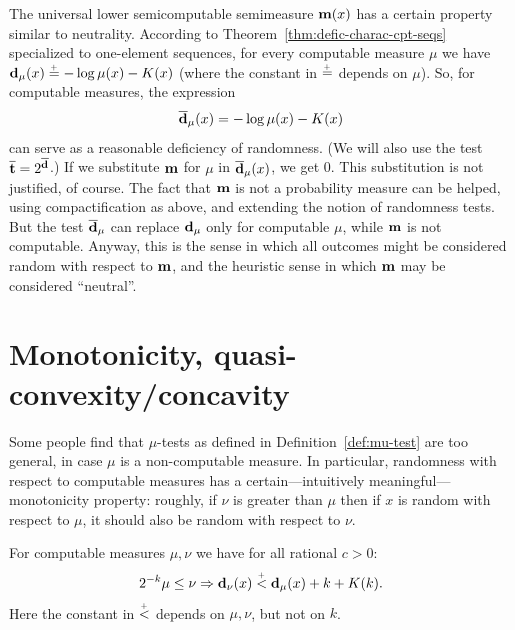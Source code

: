 The universal lower semicomputable
semimeasure \( \mathbf{m}(x) \) has a certain property similar to neutrality.
According to Theorem~\ref{thm:defic-charac-cpt-seqs} specialized to
one-element sequences, for every computable measure \( \mu \) we have
\( \mathbf{d}_{\mu}(x) \stackrel{{}_+}{=} -\log\mu(x) - K(x) \)
(where the constant in \( \stackrel{{}_+}{=} \) depends on \( \mu \)).
So, for computable measures, the expression
 \begin{equation}\label{eq:ol-d}
  \overline{\mathbf{d}}_{\mu}(x) = -\log\mu(x) - K(x)
 \end{equation}
can serve as a reasonable deficiency of randomness.
(We will also use the test \( \overline{\mathbf{t}} = 2^{\overline{\mathbf{d}}} \).)
If we substitute \( \mathbf{m} \) for \( \mu \) in \( \overline{\mathbf{d}}_{\mu}(x) \), we get 0.
This substitution is not justified, of course.
The fact that \( \mathbf{m} \) is not a probability 
measure can be helped, using compactification as above, 
and extending the notion of randomness tests. 
But the test \( \overline{\mathbf{d}}_{\mu} \) can replace \( \mathbf{d}_{\mu} \)
only for computable \( \mu \), while \( \mathbf{m} \) is not computable.
Anyway, this is the sense in which all outcomes might
be considered random with respect to \( \mathbf{m} \), and the heuristic
sense in which \( \mathbf{m} \) may be considered ``neutral''.

\section{Monotonicity, quasi-convexity/concavity}

 Some people find that \( \mu \)-tests as defined in Definition~\ref{def:mu-test} are
 too general, in case \( \mu \) is a non-computable measure.
 In particular, randomness with respect to computable measures has 
 a certain---intuitively meaningful---monotonicity property:
 roughly, if \( \nu \) is greater than \( \mu \) then if
 \( x \) is random with respect to \( \mu \), it should also be random with respect to
 \( \nu \).

  \begin{proposition}\label{propo:test-computable-mon}
 For computable measures \( \mu,\nu \) we have for all rational \( c>0 \):
  \begin{align}\label{eq:test-computable-mon}
   2^{-k}\mu\le \nu \Rightarrow \mathbf{d}_{\nu}(x)\stackrel{{}_+}{<} \mathbf{d}_{\mu}(x)+ k + K(k).
  \end{align}
 Here the constant in \( \stackrel{{}_+}{<} \) depends on \( \mu,\nu \), but not on \( k \).
  \end{proposition}

